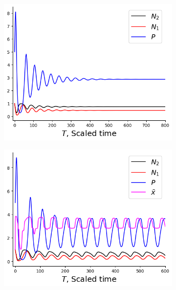 \begin{figure}[htbp]
\begin{subfigure}[b]{.35 \textwidth}
	\label{fig_onex_2}
\end{subfigure}
\begin{subfigure}[b]{.35 \textwidth}
	\centering
	\caption{}
	\includegraphics[width=\textwidth]{Figures/params_pop1_onex_4_plotall.png}
	\label{fig_onex_4}
\end{subfigure}
\begin{subfigure}[b]{.35 \textwidth}
	\centering
	\caption{}
	\includegraphics[width=\textwidth]{Figures/params_pop1_plotall.png}
	\label{fig_changex}
\end{subfigure}

\end{figure}
